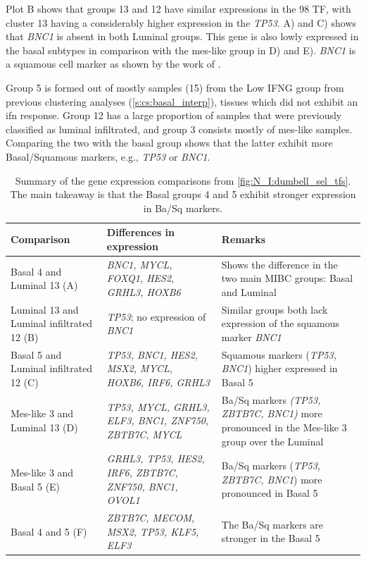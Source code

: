 Plot B shows that groups 13 and 12 have similar expressions in the 98 TF, with cluster 13 having a considerably higher expression in the \textit{TP53}.  A) and C) shows that \textit{BNC1} is absent in both Luminal groups. This gene is also lowly expressed in the basal subtypes in comparison with the mes-like group in D) and E). \textit{BNC1} is a squamous cell marker as shown by the work of \citet{Hurst2022-sp}.

Group 5 is formed out of mostly samples (15) from the Low IFNG group from previous clustering analyses (\cref{s:cs:basal_interp}), tissues which did not exhibit an \acrlong{ifn} response. Group 12 has a large proportion of samples that were previously classified as luminal infiltrated, and group 3 consists mostly of mes-like samples. Comparing the two with the basal group shows that the latter exhibit more Basal/Squamous markers, e.g., \textit{TP53} or \textit{BNC1}.

\begin{table}[!t]
    \centering
    \scriptsize
    \begin{tabularx}{\textwidth}{>{\hsize=0.8\hsize}X|>{\hsize=0.8\hsize}X|>{\hsize=1.4\hsize}X}
        \toprule
        \textbf{Comparison} & \textbf{Differences in expression} & \textbf{Remarks} \\
        \midrule
        Basal 4 and Luminal 13 (A) & \textit{BNC1, MYCL, FOXQ1, HES2, GRHL3, HOXB6} & Shows the difference in the two main MIBC groups: Basal and Luminal \\
        \midrule
        Luminal 13 and Luminal infiltrated 12 (B) & \textit{TP53}; no expression of \textit{BNC1} & Similar groups both lack expression of the squamous marker \textit{BNC1} \\
        \midrule
        Basal 5 and Luminal infiltrated 12 (C) & \textit{TP53, BNC1, HES2, MSX2, MYCL, HOXB6, IRF6, GRHL3} & Squamous markers (\textit{TP53, BNC1}) higher expressed in Basal 5 \\
        \midrule
        Mes-like 3 and Luminal 13 (D) & \textit{TP53, MYCL, GRHL3, ELF3, BNC1, ZNF750, ZBTB7C, MYCL} & Ba/Sq markers \textit{(TP53, ZBTB7C, BNC1)} more pronounced in the Mes-like 3 group over the Luminal \\
        \midrule
        Mes-like 3 and  Basal 5 (E) & \textit{GRHL3, TP53, HES2, IRF6, ZBTB7C, ZNF750, BNC1, OVOL1} & Ba/Sq markers (\textit{TP53, ZBTB7C, BNC1}) more pronounced in Basal 5 \\
        \midrule
        Basal 4 and 5 (F) & \textit{ZBTB7C, MECOM, MSX2, TP53, KLF5, ELF3} & The Ba/Sq markers are stronger in the Basal 5 \\
        \bottomrule
    \end{tabularx}
    \caption[Summary of the gene expressions]{Summary of the gene expression comparisons from \cref{fig:N_I:dumbell_sel_tfs}. The main takeaway is that the Basal groups 4 and 5 exhibit stronger expression in Ba/Sq markers.}
    \label{tab:N_I:dumbel_summarry}
\end{table}


